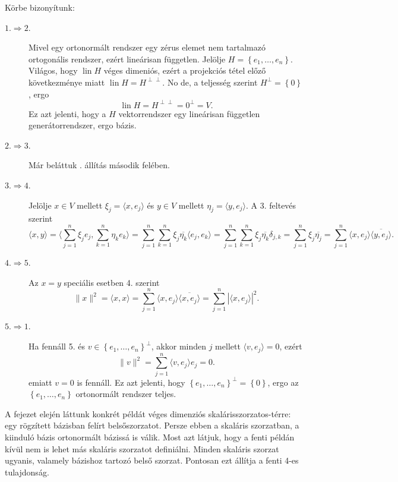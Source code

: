 \documentclass[a4paper, showtrims]{memoir}
\makeatletter
\renewenvironment{proof}[1][\proofname]
    {\par\pushQED{\qed}%
    \normalfont \topsep6\p@\@plus6\p@\relax
    \trivlist
    \item[\hskip\labelsep
        \itshape
    #1\@addpunct{:}]\ignorespaces}
    {\popQED\endtrivlist\@endpefalse}
\theoremstyle{plain}
\theoremstyle{remark}
\theoremstyle{definition}
\DeclareMathOperator{\lin}{lin}
\newcommand{\ip}[2]{\langle#1,#2\rangle}
\makeatother
\begin{document}
\begin{proof}
	Körbe bizonyítunk:
	\begin{description}
		\item[$1.\Rightarrow 2.$]
		      Mivel egy ortonormált rendszer egy zérus elemet nem tartalmazó ortogonális rendszer,
		      ezért lineárisan független.
		      Jelölje $H=\left\{ e_1,\ldots,e_n \right\}$.
		      Világos, hogy $\lin H$ véges dimeniós, ezért a projekciós tétel előző következménye miatt
		      $\lin H=H^{\perp\perp}$.
		      No de, a teljesség szerint $H^\perp=\left\{ 0 \right\}$,
		      ergo
		      \[
			      \lin H
			      =
			      H^{\perp\perp}
			      =
			      {0}^\perp
			      =
			      V.
		      \]
		      Ez azt jelenti, hogy a $H$ vektorrendszer egy lineárisan független generátorrendszer, ergo bázis.

		\item[$2.\Rightarrow 3.$]
            Már beláttuk . állítás második felében.

		\item[$3.\Rightarrow 4.$]
		      Jelölje $x\in V$ mellett $\xi_j=\ip{x}{e_j}$ és $y\in V$ mellett
		      $\eta_j=\ip{y}{e_j}$.
		      A 3. feltevés szerint
		      \[
			      \ip{x}{y}
			      =
			      \ip{\sum_{j=1}^n\xi_je_j}{\sum_{k=1}^n\eta_ke_k}
			      =
			      \sum_{j=1}^n\sum_{k=1}^n\xi_j\overline{\eta_k}\ip{e_j}{e_k}
			      =
			      \sum_{j=1}^n\sum_{k=1}^n\xi_j\overline{\eta_k}\delta_{j,k}
			      =
			      \sum_{j=1}^n\xi_j\overline{\eta_j}
			      =
			      \sum_{j=1}^n\ip{x}{e_j}\overline{\ip{y}{e_j}}.
		      \]

		\item[$4.\Rightarrow 5.$]
		      Az $x=y$ speciális esetben 4. szerint
		      \[
			      \|x\|^2
			      =
			      \ip{x}{x}
			      =
			      \sum_{j=1}^n\ip{x}{e_j}\overline{\ip{x}{e_j}}
			      =
			      \sum_{j=1}^n|\ip{x}{e_j}|^2.
		      \]

		\item[$5.\Rightarrow 1.$]
		      Ha fennáll 5. és $v\in\left\{ e_1,\ldots,e_n \right\}^\perp$,
		      akkor minden $j$ mellett $\ip{v}{e_j}=0$, ezért
		      \[
			      \|v\|^2
			      =
			      \sum_{j=1}^n\ip{v}{e_j}e_j
			      =
			      0.
		      \]
		      emiatt $v=0$ is fennáll.
		      Ez azt jelenti, hogy $\left\{ e_1,\ldots,e_n \right\}^\perp=\left\{ 0 \right\}$,
		      ergo az $\left\{ e_1,\ldots,e_n \right\}$ ortonormált rendszer teljes.\qedhere
	\end{description}
\end{proof}
A fejezet elején láttunk konkrét példát véges dimenziós skalárisszorzatos-térre:
egy rögzített bázisban felírt belsőszorzatot. Persze ebben a skaláris szorzatban,
a kiinduló bázis ortonormált bázissá is válik.
Most azt látjuk, hogy a fenti példán kívül nem is lehet más skaláris szorzatot definiálni.
Minden skaláris szorzat ugyanis, valamely bázishoz tartozó belső szorzat.
Pontosan ezt állítja a fenti 4-es tulajdonság.
\end{document}
